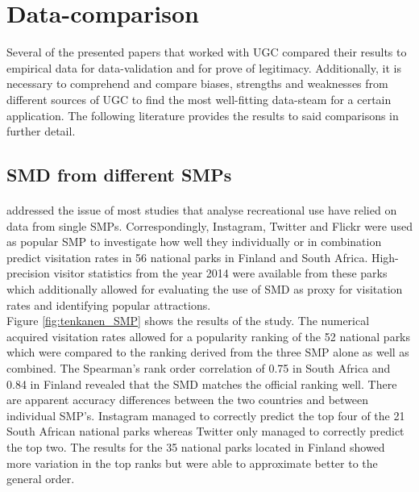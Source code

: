 \section{Data-comparison} \label{data_comparison_SotA}
Several of the presented papers that worked with UGC compared their results to empirical data for data-validation and for prove of legitimacy. Additionally, it is necessary to comprehend and compare biases, strengths and weaknesses from different sources of UGC to find the most well-fitting data-steam for a certain application. The following literature provides the results to said comparisons in further detail.

\subsection{SMD from different SMPs} \label{SMP_vs_SMP}

\paragraph*{\textcite{Tenkanen2017}} addressed the issue of most studies that analyse recreational use have relied on data from single SMPs. Correspondingly, Instagram, Twitter and Flickr were used as popular SMP to investigate how well they individually or in combination predict visitation rates in 56 national parks in Finland and South Africa. High-precision visitor statistics from the year 2014 were available from these parks which additionally allowed for evaluating the use of SMD as proxy for visitation rates and identifying popular attractions.\\
Figure \ref{fig:tenkanen_SMP} shows the results of the study. The numerical acquired visitation rates allowed for a popularity ranking of the 52 national parks which were compared to the ranking derived from the three SMP alone as well as combined. The Spearman's rank order correlation of 0.75 in South Africa and 0.84 in Finland revealed that the SMD matches the official ranking well. There are apparent accuracy differences between the two countries and between individual SMP's. Instagram managed to correctly predict the top four of the 21 South African national parks whereas Twitter only managed to correctly predict the top two. The results for the 35 national parks located in Finland showed more variation in the top ranks but were able to approximate better to the general order.


